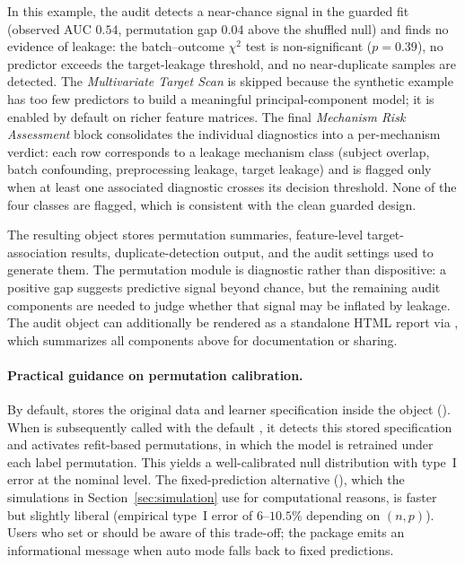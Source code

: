 \documentclass[article,shortnames]{jss}
\begin{document}
\noindent
In this example, the audit detects a near-chance signal in the guarded fit (observed AUC $0.54$, permutation gap $0.04$ above the shuffled null) and finds no evidence of leakage: the batch--outcome $\chi^2$ test is non-significant ($p = 0.39$), no predictor exceeds the target-leakage threshold, and no near-duplicate samples are detected. The \emph{Multivariate Target Scan} is skipped because the synthetic example has too few predictors to build a meaningful principal-component model; it is enabled by default on richer feature matrices. The final \emph{Mechanism Risk Assessment} block consolidates the individual diagnostics into a per-mechanism verdict: each row corresponds to a leakage mechanism class (subject overlap, batch confounding, preprocessing leakage, target leakage) and is flagged only when at least one associated diagnostic crosses its decision threshold. None of the four classes are flagged, which is consistent with the clean guarded design.

The resulting  object stores permutation summaries, feature-level target-association results, duplicate-detection output, and the audit settings used to generate them. The permutation module is diagnostic rather than dispositive: a positive gap suggests predictive signal beyond chance, but the remaining audit components are needed to judge whether that signal may be inflated by leakage. The audit object can additionally be rendered as a standalone HTML report via , which summarizes all components above for documentation or sharing.

\paragraph{Practical guidance on permutation calibration.}
By default,  stores the original data and learner
specification inside the  object (). When  is subsequently called with the
default , it detects this stored specification
and activates refit-based permutations, in which the model is retrained
under each label permutation. This yields a well-calibrated null
distribution with type~I error at the nominal level. The fixed-prediction
alternative (), which the simulations in
Section~\ref{sec:simulation} use for computational reasons, is faster
but slightly liberal (empirical type~I error of $6$--$10.5\%$ depending
on $(n, p)$). Users who set  or
 should be aware of this trade-off;
the package emits an informational message when auto mode falls back to
fixed predictions.
\end{document}
